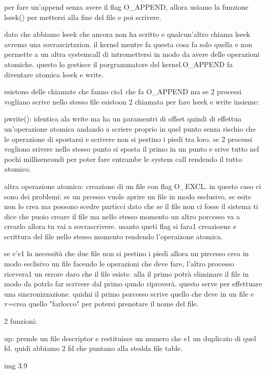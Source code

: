 per fare un'append senza avere il flag O\_APPEND, allora usiamo la funzione lseek() per mettersi alla fine del file e poi scrivere.

dato che abbiamo lseek che ancora non ha scritto e qualcun'altro chiama lseek avremo una sovrascirtzzion. il kernel mentre fa questa cosa fa solo quella e non permette a un altra systemcall di intromettersi in modo da avere delle operazioni atomiche. questo lo gestisce il porgrammatore del kernel.O\_APPEND fa diventare atomica lseek e write.

esistono delle chiamate che fanno cio1 che fa O\_APPEND ma se 2 processi vogliano scrive nello stesso file esistoon 2 chiamata per fare lseek e write insieme:

pwrite(): identica ala write ma ha un paramentri di offset quindi di effettua un'operazione atomica andando a scriere proprio in quel punto senza rischio che le operazione di spostarsi e scrivere non si pestino i piedi tra loro. se 2 processi vogliono srivere nello stesso punto si sposta il primo in un punto e srive tutto nel pochi millisencondi per poter fare entrambe le system call rendendo il tutto atomico.

altra operazione atomica: creazione di un file con flag O\_EXCL. in questo caso ci sono dei problemi: se un prcesso vuole aprire un file in modo esclusivo, se esite non lo crea ma possono scedre particci dato che se il file non ci fosse il sistema ti dice che puoio creare il file ma nello stesso momento un altro porcesso va a crearlo allora tu vai a sovrascrivere. usanto queti flag si fara1 creazioene e scrittura del file nello stesso momento rendendo l'operaizone atomica.

se c'e1 la necessità che due file non si pestino i piedi allora un pircesso crea in modo esclisivo un file facendo le operazioni che deve fare, l'altro processo ricevera1 un errore daro che il file esiste. alla il primo potrà eliminare il file in modo da potrlo far scrivere dal primo qundo riproverà. questo serve per effettuare una sincronizzazione. quidni il primo porcesso scrive quello che deve in un file e v=crea quello "farlocco" per potersi prenotare il nome del file. 





2 funzioni:

up: prende un file descriptor e restituisce un numero che e1 un duplicato di quel fd. quidi abbiamo 2 fd che puntano alla stedda file table.


img 3.9


